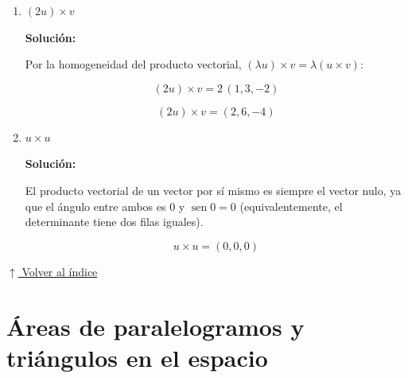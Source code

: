 \documentclass[12pt]{article}
\newcommand{\solucion}{%
    \vspace{0.8em}%
    \textbf{Solución:}%
    \vspace{0.8em}%
}
\newcommand{\volverindice}{%
    \vspace{1em}%
    \begin{flushright}%
        \hyperlink{indice}{\small $\uparrow$ Volver al índice}%
    \end{flushright}%
}
\begin{document}
\begin{enumerate}[label=\alph*.-]
\begin{enumerate}[label=\roman*)]
        \[
        \boxed{v\cdot(u\times v)=0}
        \]

        \item $(2u)\times v$

        \solucion

        Por la homogeneidad del producto vectorial,
        $(\lambda u)\times v=\lambda(u\times v)$:

        \[
        (2u)\times v=2\,(1,3,-2)
        \]

        \[
        \boxed{(2u)\times v=(2,6,-4)}
        \]

        \item $u\times u$

        \solucion

        El producto vectorial de un vector por sí mismo es siempre el vector
        nulo, ya que el ángulo entre ambos es $0$ y
        $\operatorname{sen}0=0$ (equivalentemente, el determinante tiene dos
        filas iguales).

        \[
        \boxed{u\times u=(0,0,0)}
        \]

    \end{enumerate}

\end{enumerate}

\volverindice
\newpage


\section{Áreas de paralelogramos y triángulos en el espacio}
\end{document}
